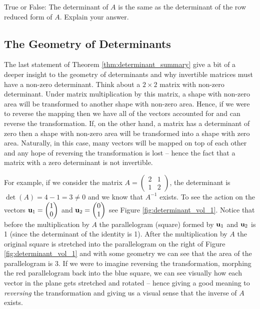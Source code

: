 \begin{problem}
    True or False: The determinant of $A$ is the same as the determinant of the row
    reduced form of $A$.  Explain your answer.
\end{problem}

\subsection{The Geometry of Determinants}
The last statement of Theorem \ref{thm:determinant_summary} give a bit of a deeper insight
to the geometry of determinants and why invertible matrices must have a non-zero
determinant.  Think about a $2 \times 2$ matrix with non-zero determinant.  Under matrix
multiplication by this matrix, a shape with non-zero area will be transformed to another
shape with non-zero area.  Hence, if we were to reverse the mapping then we have all of
the vectors accounted for and can reverse the transformation.  If, on the other hand, a
matrix has a determinant of zero then a shape with non-zero area will be transformed into
a shape with zero area.  Naturally, in this case, many vectors will be mapped on top of
each other and any hope of reversing the transformation is lost -- hence the fact that a
matrix with a zero determinant is not invertible.

For example, if we consider the matrix $A = \begin{pmatrix} 2&1\\1&2\end{pmatrix}$, the
determinant is $\det(A) = 4-1=3 \ne 0$ and we know that $A^{-1}$ exists.  To see the
action on the vectors ${\bf u}_1 = \begin{pmatrix}1\\0\end{pmatrix}$ and ${\bf u}_2 =
\begin{pmatrix}0\\1\end{pmatrix}$ see Figure \ref{fig:determinant_vol_1}.  Notice that
before the multiplication by $A$ the parallelogram (square) formed by ${\bf u}_1$ and ${\bf u}_2$ is 1
(since the determinant of the identity is 1).  After the multiplication by $A$ the
original square is stretched into the parallelogram on the right of Figure
\ref{fig:determinant_vol_1} and with some geometry we can see that the area of the
parallelogram is $3$.  If we were to imagine reversing the transformation, morphing the
red parallelogram back into the blue square, we can see visually how each vector in the plane gets
stretched and rotated -- hence giving a good meaning to {\it reversing} the
transformation and giving us a visual sense that the inverse of $A$ exists.

